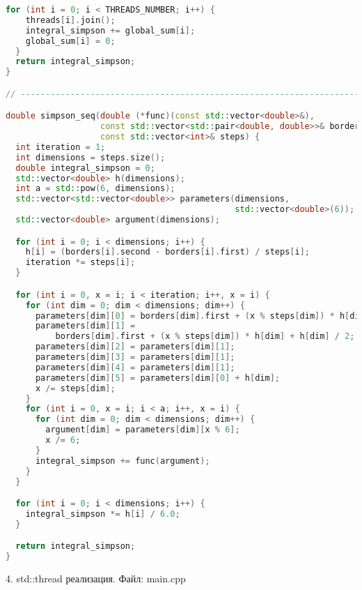 \documentclass{report}
\begin{document}
\begin{lstlisting}[language=C++]
  for (int i = 0; i < THREADS_NUMBER; i++) {
    threads[i].join();
    integral_simpson += global_sum[i];
    global_sum[i] = 0;
  }
  return integral_simpson;
}

// ----------------------------------------------------------------------

double simpson_seq(double (*func)(const std::vector<double>&),
                   const std::vector<std::pair<double, double>>& borders,
                   const std::vector<int>& steps) {
  int iteration = 1;
  int dimensions = steps.size();
  double integral_simpson = 0;
  std::vector<double> h(dimensions);
  int a = std::pow(6, dimensions);
  std::vector<std::vector<double>> parameters(dimensions,
                                              std::vector<double>(6));
  std::vector<double> argument(dimensions);

  for (int i = 0; i < dimensions; i++) {
    h[i] = (borders[i].second - borders[i].first) / steps[i];
    iteration *= steps[i];
  }

  for (int i = 0, x = i; i < iteration; i++, x = i) {
    for (int dim = 0; dim < dimensions; dim++) {
      parameters[dim][0] = borders[dim].first + (x % steps[dim]) * h[dim];
      parameters[dim][1] =
          borders[dim].first + (x % steps[dim]) * h[dim] + h[dim] / 2;
      parameters[dim][2] = parameters[dim][1];
      parameters[dim][3] = parameters[dim][1];
      parameters[dim][4] = parameters[dim][1];
      parameters[dim][5] = parameters[dim][0] + h[dim];
      x /= steps[dim];
    }
    for (int i = 0, x = i; i < a; i++, x = i) {
      for (int dim = 0; dim < dimensions; dim++) {
        argument[dim] = parameters[dim][x % 6];
        x /= 6;
      }
      integral_simpson += func(argument);
    }
  }

  for (int i = 0; i < dimensions; i++) {
    integral_simpson *= h[i] / 6.0;
  }

  return integral_simpson;
}
\end{lstlisting}

\par 4. std::thread реализация. Файл: main.cpp
\end{document}
